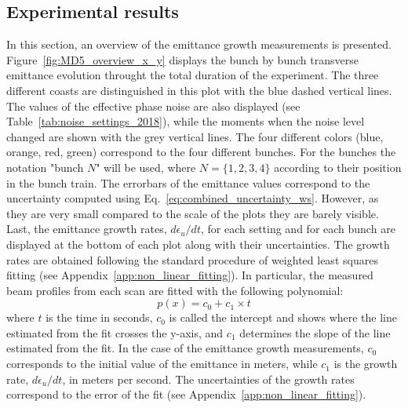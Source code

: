 \subsection{Experimental results}\label{sec:MD5_overview}
In this section, an overview of the emittance growth measurements is presented. Figure~\ref{fig:MD5_overview_x_y} displays the bunch by bunch transverse emittance evolution throught the total duration of the experiment. The three different coasts are distinguished in this plot with the blue dashed vertical lines. The values of the effective phase noise are also displayed (see Table~\ref{tab:noise_settings_2018}), while the moments when the noise level changed are shown with the grey vertical lines. The four different colors (blue, orange, red, green) correspond to the four different bunches. For the bunches the notation "bunch $N$" will be used, where $N=\{1,2,3,4\}$ according to their position in the bunch train. The errorbars of the emittance values correspond to the uncertainty computed using Eq.~\ref{eq:combined_uncertainty_ws}. However, as they are very small compared to the scale of the plots they are barely visible. Last, the emittance growth rates, $d\epsilon_u /dt$, for each setting and for each bunch are displayed at the bottom of each plot along with their uncertainties. The growth rates are obtained following the standard procedure of weighted least squares fitting (see Appendix~\ref{app:non_linear_fitting}). In particular, the measured beam profiles from each scan are fitted with the following polynomial:
\begin{equation}\label{eq:polynimial_for_linear_fit}
   p(x) = c_0 + c_1 \times t
\end{equation}
where $t$ is the time in seconds, $c_0$ is called the intercept and shows where the line estimated from the fit crosses the y-axis, and $c_1$ determines the slope of the line estimated from the fit.  In the case of the emittance growth measurements, $c_0$ corresponds to the initial value of the emittance in meters, while $c_1$ is the growth rate, $d\epsilon_u /dt$, in meters per second. The uncertainties of the growth rates correspond to the error of the fit (see Appendix~\ref{app:non_linear_fitting}).

